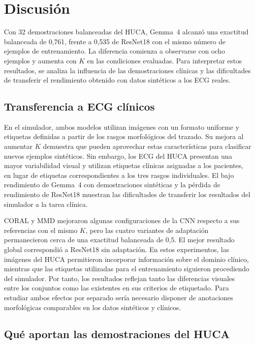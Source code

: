 \chapter{Discusión}
\label{chap:discusion}

Con 32 demostraciones balanceadas del HUCA, Gemma~4 alcanzó una exactitud balanceada de 0,761, frente a 0,535 de ResNet18 con el mismo número de ejemplos de entrenamiento. La diferencia comienza a observarse con ocho ejemplos y aumenta con \(K\) en las condiciones evaluadas. Para interpretar estos resultados, se analiza la influencia de las demostraciones clínicas y las dificultades de transferir el rendimiento obtenido con datos sintéticos a los ECG reales.

\section{Transferencia a ECG clínicos}

En el simulador, ambos modelos utilizan imágenes con un formato uniforme y etiquetas definidas a partir de los rasgos morfológicos del trazado. Su mejora al aumentar \(K\) demuestra que pueden aprovechar estas características para clasificar nuevos ejemplos sintéticos. Sin embargo, los ECG del HUCA presentan una mayor variabilidad visual y utilizan etiquetas clínicas asignadas a los pacientes, en lugar de etiquetas correspondientes a los tres rasgos individuales. El bajo rendimiento de Gemma~4 con demostraciones sintéticas y la pérdida de rendimiento de ResNet18 muestran las dificultades de transferir los resultados del simulador a la tarea clínica.

CORAL y MMD mejoraron algunas configuraciones de la CNN respecto a sus referencias con el mismo \(K\), pero las cuatro variantes de adaptación permanecieron cerca de una exactitud balanceada de 0,5. El mejor resultado global correspondió a ResNet18 sin adaptación. En estos experimentos, las imágenes del HUCA permitieron incorporar información sobre el dominio clínico, mientras que las etiquetas utilizadas para el entrenamiento siguieron procediendo del simulador. Por tanto, los resultados reflejan tanto las diferencias visuales entre los conjuntos como las existentes en sus criterios de etiquetado. Para estudiar ambos efectos por separado sería necesario disponer de anotaciones morfológicas comparables en los datos sintéticos y clínicos.

\section{Qué aportan las demostraciones del HUCA}

